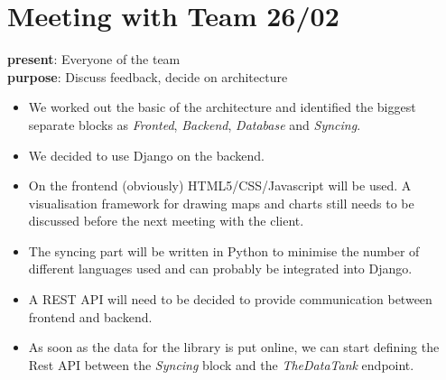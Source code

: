 \section{Meeting with Team 26/02}
{\bf present}: Everyone of the team\\
{\bf purpose}: Discuss feedback, decide on architecture\\
\begin{itemize}
  \item We worked out the basic of the architecture and identified the biggest separate blocks as \emph{Fronted}, \emph{Backend}, \emph{Database} and \emph{Syncing}.
  \item We decided to use Django on the backend.
  \item On the frontend (obviously) HTML5/CSS/Javascript will be used. A visualisation framework for drawing maps and charts still needs to be discussed before the next meeting with the client.
  \item The syncing part will be written in Python to minimise the number of different languages used and can probably be integrated into Django.
  \item A REST API will need to be decided to provide communication between frontend and backend.
  \item As soon as the data for the library is put online, we can start defining the Rest API between the \emph{Syncing} block and the \emph{TheDataTank} endpoint.
\end{itemize}

